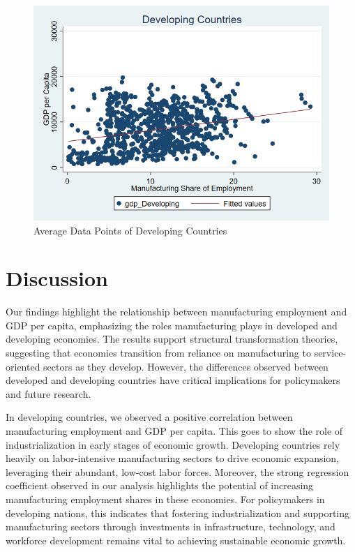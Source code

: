 \documentclass[12pt]{article}
\begin{document}
\begin{figure}[htbp]
    \centering
    \includegraphics[width=0.75\linewidth]{Reproducibility Package/Variable Graphs/Developing Final (better view).png}
    \caption{Average Data Points of Developing Countries}
    \label{fig:Developing-label}
\end{figure}

\section{Discussion}
\label{sec:discussion}

    Our findings highlight the relationship between manufacturing employment and GDP per capita, emphasizing the roles manufacturing plays in developed and developing economies. The results support structural transformation theories, suggesting that economies transition from reliance on manufacturing to service-oriented sectors as they develop. However, the differences observed between developed and developing countries have critical implications for policymakers and future research.
    
    In developing countries, we observed a positive correlation between manufacturing employment and GDP per capita. This goes to show the role of industrialization in early stages of economic growth. Developing countries rely heavily on labor-intensive manufacturing sectors to drive economic expansion, leveraging their abundant, low-cost labor forces. Moreover, the strong regression coefficient observed in our analysis highlights the potential of increasing manufacturing employment shares in these economies. For policymakers in developing nations, this indicates that fostering industrialization and supporting manufacturing sectors through investments in infrastructure, technology, and workforce development remains vital to achieving sustainable economic growth. 
    
\end{document}
